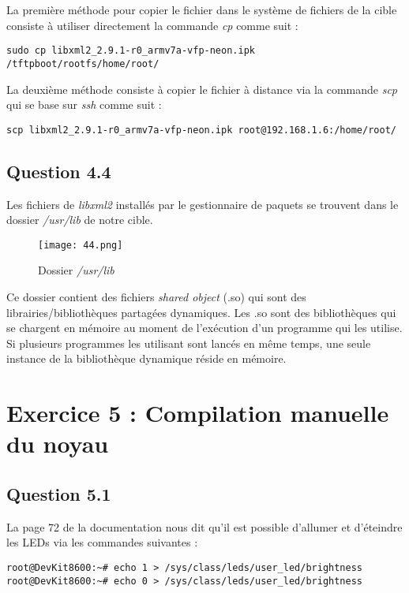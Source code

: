 \documentclass[a4paper,12pt]{report}
\begin{document}
La première méthode pour copier le fichier dans le système de fichiers de la cible consiste à utiliser directement la commande \textit{cp} comme suit : 
\begin{verbatim}
sudo cp libxml2_2.9.1-r0_armv7a-vfp-neon.ipk /tftpboot/rootfs/home/root/
\end{verbatim}

La deuxième méthode consiste à copier le fichier à distance via la commande \textit{scp} qui se base sur \textit{ssh} comme suit : 
\begin{verbatim}
scp libxml2_2.9.1-r0_armv7a-vfp-neon.ipk root@192.168.1.6:/home/root/
\end{verbatim}

\subsection{Question 4.4}

Les fichiers de \textit{libxml2} installés par le gestionnaire de paquets se trouvent dans le dossier \textit{/usr/lib} de notre cible.

\begin{figure}[h]
	\centering
		\texttt{[image: 44.png]}
		\caption{Dossier \textit{/usr/lib}}
\end{figure}

Ce dossier contient des fichiers \textit{shared object} (.so) qui sont des librairies/bibliothèques partagées dynamiques.
Les .so sont des bibliothèques qui se chargent en mémoire au moment de l'exécution d'un programme qui les utilise. Si plusieurs programmes les utilisant sont lancés en même temps, une seule instance de la bibliothèque dynamique réside en mémoire.
\newpage

\section{Exercice 5 : Compilation manuelle du noyau}
\subsection{Question 5.1}

La page 72 de la documentation nous dit qu'il est possible d'allumer et d'éteindre les LEDs via les commandes suivantes :
\begin{verbatim}
root@DevKit8600:~# echo 1 > /sys/class/leds/user_led/brightness
root@DevKit8600:~# echo 0 > /sys/class/leds/user_led/brightness
\end{verbatim}
\end{document}
